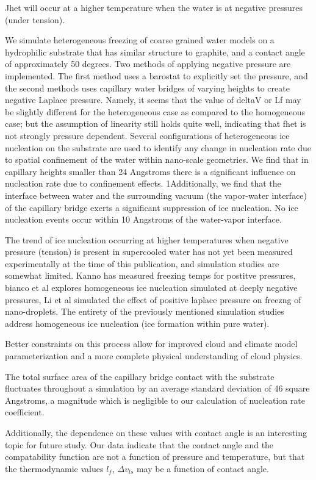 Jhet will occur at a higher temperature when the water is at negative pressures (under tension).

We simulate heterogeneous freezing of coarse grained water models on a hydrophilic substrate that has
similar structure to graphite, and a contact angle of approximately 50 degrees.  Two methods
of applying negative pressure are implemented. The first method uses a barostat to explicitly set the pressure,
and the second methods uses capillary water bridges of varying heights to create negative Laplace pressure.
Namely, it seems that the value of deltaV or Lf may be slightly different for the heterogeneous case as
compared to the homogeneous case; but the assumption of linearity still holds quite well, indicating that fhet is
not strongly pressure dependent.
Several configurations of heterogeneous ice nucleation on the substrate are used to identify any change in
nucleation rate due to spatial confinement of the water within nano-scale geometries. We find that in capillary
heights smaller than 24 Angstroms there is a significant influence on nucleation rate due to confinement effects.
1Additionally, we find that the interface between water and the surrounding vacuum (the vapor-water interface)
of the capillary bridge exerts a significant suppression of ice nucleation. No ice nucleation events occur within
10 Angstroms of the water-vapor interface.


The trend of ice nucleation occurring at higher temperatures when negative pressure (tension) is present in supercooled water has not yet been measured experimentally at the time of this publication, and simulation studies are somewhat limited.  Kanno has measured freezing temps for postitve pressures, bianco et al explores homogeneous ice nucleation simulated at deeply  negative pressures, Li et al simulated the effect of positive laplace pressure on freezng of nano-droplets. 
The entirety of the previously mentioned simulation studies address homogeneous ice nucleation (ice formation within pure water).

Better constraints on this process allow for improved cloud and climate model parameterization and a more complete physical understanding of cloud physics. 

The total surface area of the capillary bridge contact with the substrate fluctuates throughout a simulation by an average standard deviation of 46 square Angstroms, a magnitude which is negligible to our calculation of nucleation rate coefficient. 

Additionally, the dependence on these values with contact angle is an interesting topic for future study. Our data indicate that the contact angle and the compatability function are not a function of pressure and temperature, but that the thermodynamic values $l_f$, $\Delta v_{ls}$ may be a function of contact angle.

